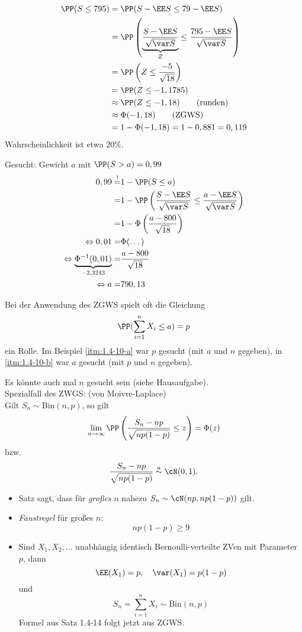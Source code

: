 \begin{anumerate}
\item
\begin{align*}
\PP(S \leq 795) &= \PP( S - \EE S \leq 79 - \EE S) \\
&= \PP\left(\underbrace{\frac{S - \EE S}{\sqrt{\var S}}}_{Z}\leq \frac{795-\EE S}{\sqrt{ \var S}}\right)\\
&= \PP\left( Z \leq \frac{-5}{\sqrt{18}}\right)\\
&= \PP(Z \leq - 1,1785)\\
&\approx \PP(Z \leq - 1,18) \qquad \text{(runden)}\\
&\approx \Phi(-1,18) \qquad \text{(ZGWS)}\\
&= 1- \Phi(-1,18) = 1-0,881 = 0,119
\end{align*}
Wahrscheinlichkeit ist etwa $20\%$.
\item Gesucht: Gewicht $a$ mit $\PP(S > a) = 0,99$
\begin{align*}
0,99 \overset{!}{=}& 1- \PP(S \leq a)\\
=& 1- \PP\left( \frac{S-\EE S}{\sqrt{\var S}} \leq \frac{a-\EE S}{\sqrt{\var S}}\right)\\
=& 1- \Phi\left(\frac{a-800}{\sqrt{18}}\right)\\
\Leftrightarrow 0,01 =& \Phi (\dots)\\
\Leftrightarrow \underbrace{\Phi^{-1} (0,01)}_{-2,3243} =& \frac{a-800}{\sqrt{18}}\\
\Leftrightarrow a =& 790,13
\end{align*}
\end{anumerate}

Bei der Anwendung des ZGWS spielt oft die Gleichung
$$\PP(\sum_{i=1}^n X_i \leq a) = p$$
ein Rolle. Im Beispiel \ref{itm:1.4-10-a} war $p$ gesucht (mit $a$ und $n$ gegeben), in \ref{itm:1.4-10-b} war $a$ gesucht (mit $p$ und $n$ gegeben). 

Es könnte auch mal $n$ gesucht sein (siehe Hausaufgabe).\\
Spezialfall des ZWGS:
 (von Moivre-Laplace)\\
Gilt $S_n \sim \mathrm{Bin}(n,p)$, so gilt 
$$\lim_{n\to \infty} \PP\left( \frac{S_n - np}{\sqrt{np (1-p)}} \leq z \right) = \Phi(z)$$
bzw.
$$\frac{S_n - np}{\sqrt{np (1-p)}} \overset{a}{\sim} \cN(0,1)\text{.}$$

\begin{itemize}
\item Satz sagt, dass für \emph{großes} $n$ nahezu $S_n \sim \cN(np, np(1-p))$ gilt.
\item \emph{Faustregel} für großes $n$:
$$np(1-p) \geq 9$$
\item Sind $X_1, X_2, \ldots$ unabhängig identisch Bernoulli-verteilte ZVen mit Parameter $p$, dann
$$\EE(X_1)=p, \quad \var (X_1) = p (1-p)$$
und
$$S_n = \sum_{i=1}^n X_i \sim \mathrm{Bin}(n,p)$$
Formel aus Satz 1.4-14 folgt jetzt aus ZGWS.
\end{itemize}

